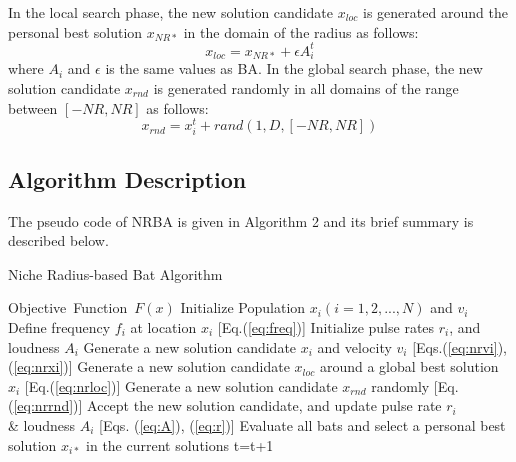 \documentclass[conference]{IEEEtran}
\begin{document}
In the local search phase, the new solution candidate $x_{loc}$ is generated around the personal best solution $x_{NR*}$ in the domain of the radius as follows:
\begin{equation}
\label{eq:nrloc}
x_{loc}=x_{NR*} + \epsilon A_i^t
\end{equation}
where $A_i$ and $\epsilon$ is the same values as BA.
In the global search phase, the new solution candidate $x_{rnd}$ is generated randomly in all domains of the range between $[-NR, NR]$ as follows: 
\begin{equation}
\label{eq:nrrnd}
x_{rnd}=x_i^t + rand(1,D,[-NR, NR])
\end{equation}

\subsection{Algorithm Description}
The pseudo code of NRBA is given in Algorithm 2 and its brief summary is described below.
\begin{algorithm}[H]
\caption{Niche Radius-based Bat Algorithm}
\label{code:ba}
\begin{algorithmic}[2]
\REQUIRE Objective\ Function\ $F(x)$
\STATE Initialize Population $x_i(i=1,2,..., N)$ and $v_i$\\
\STATE Define frequency $f_i$ at location $x_i$ [Eq.(\ref{eq:freq})]
\STATE Initialize pulse rates $r_i$, and loudness $A_i$
\STATE Generate a new solution candidate $x_i$ and velocity $v_i$ [Eqs.(\ref{eq:nrvi}), (\ref{eq:nrxi})]
\ENDIF
{}
\STATE Generate a new solution candidate $x_{loc}$ around a global best solution $x_i$ [Eq.(\ref{eq:nrloc})] 
\ENDIF
\STATE Generate a new solution candidate $x_{rnd}$ randomly [Eq.(\ref{eq:nrrnd})]
\STATE Accept the new solution candidate, and update pulse rate $r_i$ \\ \& loudness $A_i$ [Eqs. (\ref{eq:A}), (\ref{eq:r})]  
\ENDIF
\STATE Evaluate all bats and select a personal best solution $x_{i*}$ in the current solutions
\ENDFOR
\STATE t=t+1
\ENDWHILE
\end{algorithmic}
\end{algorithm}
\end{document}
